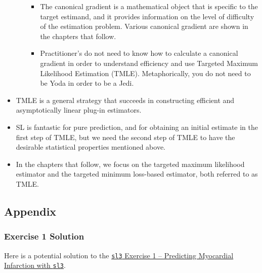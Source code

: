 \documentclass[12pt, krantz2,]{krantz}
\providecommand{\tightlist}{%
  \setlength{\itemsep}{0pt}\setlength{\parskip}{0pt}}
\theoremstyle{definition}
\theoremstyle{definition}
\theoremstyle{definition}
\newcommand{\1}{\mathbbm{1}}
\begin{document}
\begin{itemize}
\begin{itemize}
    \begin{itemize}
    \tightlist
    \item
      The canonical gradient is a mathematical object that is specific to
      the target estimand, and it provides information on the level of
      difficulty of the estimation problem. Various canonical gradient are
      shown in the chapters that follow.
    \item
      Practitioner's do not need to know how to calculate a canonical
      gradient in order to understand efficiency and use Targeted Maximum
      Likelihood Estimation (TMLE). Metaphorically, you do not need to be
      Yoda in order to be a Jedi.
    \end{itemize}
  \end{itemize}
\item
  TMLE is a general strategy that succeeds in constructing efficient and
  asymptotically linear plug-in estimators.
\item
  SL is fantastic for pure prediction, and for obtaining an initial
  estimate in the first step of TMLE, but we need the second step of TMLE to
  have the desirable statistical properties mentioned above.
\item
  In the chapters that follow, we focus on the targeted maximum likelihood
  estimator and the targeted minimum loss-based estimator, both referred to as
  TMLE.
\end{itemize}

\hypertarget{appendix}{%
\subsection*{Appendix}\label{appendix}}


\hypertarget{sl3ex1-sol}{%
\subsubsection{Exercise 1 Solution}\label{sl3ex1-sol}}

Here is a potential solution to the \protect\hyperlink{sl3ex1}{\texttt{sl3} Exercise 1 -- Predicting Myocardial
Infarction with \texttt{sl3}}.
\end{document}
